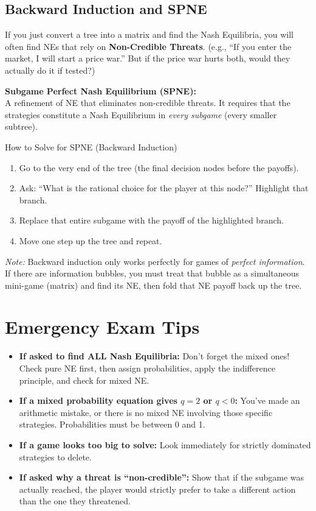 \documentclass[12pt, a4paper]{article}
\begin{document}
\subsection{Backward Induction and SPNE}
If you just convert a tree into a matrix and find the Nash Equilibria, you will often find NEs that rely on \textbf{Non-Credible Threats}. (e.g., ``If you enter the market, I will start a price war.'' But if the price war hurts both, would they actually do it if tested?)

\textbf{Subgame Perfect Nash Equilibrium (SPNE):} \\
A refinement of NE that eliminates non-credible threats. It requires that the strategies constitute a Nash Equilibrium in \textit{every subgame} (every smaller subtree).

\begin{thmbox}{How to Solve for SPNE (Backward Induction)}
  \begin{enumerate}
      \item Go to the very end of the tree (the final decision nodes before the payoffs).
      \item Ask: ``What is the rational choice for the player at this node?'' Highlight that branch.
      \item Replace that entire subgame with the payoff of the highlighted branch.
      \item Move one step up the tree and repeat.
  \end{enumerate}
  \textit{Note:} Backward induction only works perfectly for games of \textit{perfect information}. If there are information bubbles, you must treat that bubble as a simultaneous mini-game (matrix) and find its NE, then fold that NE payoff back up the tree.
\end{thmbox}

\section{Emergency Exam Tips}
\begin{itemize}
    \item \textbf{If asked to find ALL Nash Equilibria:} Don't forget the mixed ones! Check pure NE first, then assign probabilities, apply the indifference principle, and check for mixed NE.
    \item \textbf{If a mixed probability equation gives $q = 2$ or $q < 0$:} You've made an arithmetic mistake, or there is no mixed NE involving those specific strategies. Probabilities must be between 0 and 1.
    \item \textbf{If a game looks too big to solve:} Look immediately for strictly dominated strategies to delete. 
    \item \textbf{If asked why a threat is ``non-credible'':} Show that if the subgame was actually reached, the player would strictly prefer to take a different action than the one they threatened.
\end{itemize}
\end{document}
